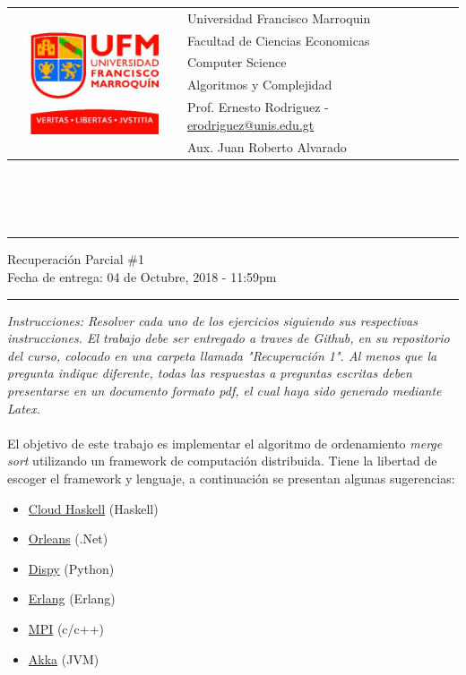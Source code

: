 \documentclass{article}
\newcommand{\horrule}[1]{\rule{\linewidth}{#1}}
\begin{document}
\begin{tabular}{l l}
\multirow{6}{*}{\includegraphics[width=5cm]{../../recursos/logo.jpg}}
 & Universidad Francisco Marroquin \\
 & Facultad de Ciencias Economicas \\
 & Computer Science \\
 & Algoritmos y Complejidad \\
 & Prof. Ernesto Rodriguez - \href{mailto:erodriguez@unis.edu.gt}{erodriguez@unis.edu.gt} \\
 & Aux. Juan Roberto Alvarado
\end{tabular}
\\\\\\

\begin{center}
        \horrule{0.5pt}
        \huge{Recuperaci\'on Parcial \#1} \\
        \large{Fecha de entrega: 04 de Octubre, 2018 - 11:59pm} \\
        \horrule{1pt}
\end{center}

\emph{Instrucciones: Resolver cada uno de los ejercicios siguiendo sus respectivas
instrucciones. El trabajo debe ser entregado a traves de Github, en su repositorio del curso, colocado en una
carpeta llamada "Recuperaci\'on 1". Al menos que la pregunta indique diferente, todas las
respuestas a preguntas escritas deben presentarse en un documento formato pdf, el cual
haya sido generado mediante Latex. }\\\\

El objetivo de este trabajo es implementar el algoritmo de ordenamiento \emph{merge sort}
utilizando un framework de computaci\'on distribuida. Tiene la libertad de escoger
el framework y lenguaje, a continuaci\'on se presentan algunas sugerencias:
\begin{itemize}
        \item{\href{https://haskell-distributed.github.io/}{Cloud Haskell} (Haskell)}
        \item{\href{https://dotnet.github.io/orleans/}{Orleans} (.Net)}
        \item{\href{https://pgiri.github.io/dispy/}{Dispy} (Python)}
        \item{\href{https://www.erlang.org/}{Erlang} (Erlang)}
        \item{\href{https://www.open-mpi.org/software/ompi/v1.10/}{MPI} (c/c++)}
        \item{\href{https://akka.io/}{Akka} (JVM)}
\end{itemize}
\end{document}
